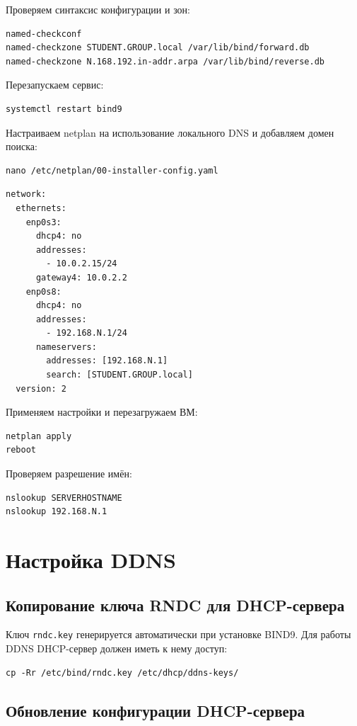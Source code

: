 \documentclass[a4paper,14pt,oneside,openany]{memoir}
\begin{document}
Проверяем синтаксис конфигурации и зон:
\begin{lstlisting}
named-checkconf
named-checkzone STUDENT.GROUP.local /var/lib/bind/forward.db
named-checkzone N.168.192.in-addr.arpa /var/lib/bind/reverse.db
\end{lstlisting}

Перезапускаем сервис:
\begin{lstlisting}
systemctl restart bind9
\end{lstlisting}

Настраиваем netplan на использование локального DNS и добавляем домен поиска:
\begin{lstlisting}
nano /etc/netplan/00-installer-config.yaml
\end{lstlisting}

\begin{lstlisting}
network:
  ethernets:
    enp0s3:
      dhcp4: no
      addresses:
        - 10.0.2.15/24
      gateway4: 10.0.2.2
    enp0s8:
      dhcp4: no
      addresses:
        - 192.168.N.1/24
      nameservers:
        addresses: [192.168.N.1]
        search: [STUDENT.GROUP.local]
  version: 2
\end{lstlisting}

Применяем настройки и перезагружаем ВМ:
\begin{lstlisting}
netplan apply
reboot
\end{lstlisting}

Проверяем разрешение имён:
\begin{lstlisting}
nslookup SERVERHOSTNAME
nslookup 192.168.N.1
\end{lstlisting}

\section{Настройка DDNS}

\subsection{Копирование ключа RNDC для DHCP-сервера}

Ключ \texttt{rndc.key} генерируется автоматически при установке BIND9. Для работы DDNS DHCP-сервер должен иметь к нему доступ:
\begin{lstlisting}
cp -Rr /etc/bind/rndc.key /etc/dhcp/ddns-keys/
\end{lstlisting}

\subsection{Обновление конфигурации DHCP-сервера}
\end{document}
